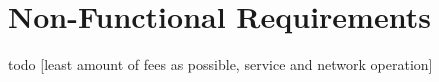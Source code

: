 \section{Non-Functional Requirements}

todo [least amount of fees as possible, service and network operation]
